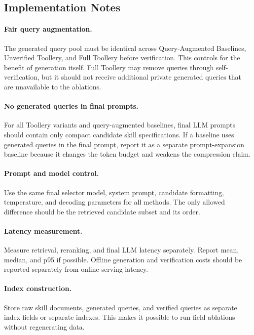 \subsection{Implementation Notes}
\label{subsec:implementation-notes}

\paragraph{Fair query augmentation.}
The generated query pool must be identical across Query-Augmented Baselines,
Unverified Toollery, and Full Toollery before verification. This controls for the
benefit of generation itself. Full Toollery may remove queries through
self-verification, but it should not receive additional private generated
queries that are unavailable to the ablations.

\paragraph{No generated queries in final prompts.}
For all Toollery variants and query-augmented baselines, final LLM prompts should
contain only compact candidate skill specifications. If a baseline uses
generated queries in the final prompt, report it as a separate prompt-expansion
baseline because it changes the token budget and weakens the compression claim.

\paragraph{Prompt and model control.}
Use the same final selector model, system prompt, candidate formatting,
temperature, and decoding parameters for all methods. The only allowed
difference should be the retrieved candidate subset and its order.

\paragraph{Latency measurement.}
Measure retrieval, reranking, and final LLM latency separately. Report mean,
median, and p95 if possible. Offline generation and verification costs should be
reported separately from online serving latency.

\paragraph{Index construction.}
Store raw skill documents, generated queries, and verified queries as separate
index fields or separate indexes. This makes it possible to run field ablations
without regenerating data.


